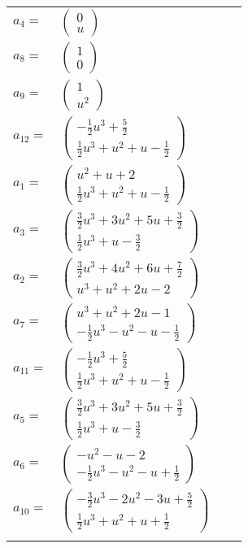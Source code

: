\documentclass[1p]{elsarticle_modified}
\theoremstyle{definition}
\begin{document}
\begin{tabular}{m{7pt} m{180pt} m{7pt} m{180pt} }
\flushright $a_{4}=$&$\begin{pmatrix}0\\u\end{pmatrix}$ \\
\flushright $a_{8}=$&$\begin{pmatrix}1\\0\end{pmatrix}$ \\
\flushright $a_{9}=$&$\begin{pmatrix}1\\u^2\end{pmatrix}$ \\
\flushright $a_{12}=$&$\begin{pmatrix}-\frac{1}{2} u^3+\frac{5}{2}\\\frac{1}{2} u^3+u^2+u-\frac{1}{2}\end{pmatrix}$ \\
\flushright $a_{1}=$&$\begin{pmatrix}u^2+u+2\\\frac{1}{2} u^3+u^2+u-\frac{1}{2}\end{pmatrix}$ \\
\flushright $a_{3}=$&$\begin{pmatrix}\frac{3}{2} u^3+3 u^2+5 u+\frac{3}{2}\\\frac{1}{2} u^3+u-\frac{3}{2}\end{pmatrix}$ \\
\flushright $a_{2}=$&$\begin{pmatrix}\frac{3}{2} u^3+4 u^2+6 u+\frac{7}{2}\\u^3+u^2+2 u-2\end{pmatrix}$ \\
\flushright $a_{7}=$&$\begin{pmatrix}u^3+u^2+2 u-1\\-\frac{1}{2} u^3- u^2- u-\frac{1}{2}\end{pmatrix}$ \\
\flushright $a_{11}=$&$\begin{pmatrix}-\frac{1}{2} u^3+\frac{5}{2}\\\frac{1}{2} u^3+u^2+u-\frac{1}{2}\end{pmatrix}$ \\
\flushright $a_{5}=$&$\begin{pmatrix}\frac{3}{2} u^3+3 u^2+5 u+\frac{3}{2}\\\frac{1}{2} u^3+u-\frac{3}{2}\end{pmatrix}$ \\
\flushright $a_{6}=$&$\begin{pmatrix}- u^2- u-2\\-\frac{1}{2} u^3- u^2- u+\frac{1}{2}\end{pmatrix}$ \\
\flushright $a_{10}=$&$\begin{pmatrix}-\frac{3}{2} u^3-2 u^2-3 u+\frac{5}{2}\\\frac{1}{2} u^3+u^2+u+\frac{1}{2}\end{pmatrix}$\\&\end{tabular}
\end{document}
